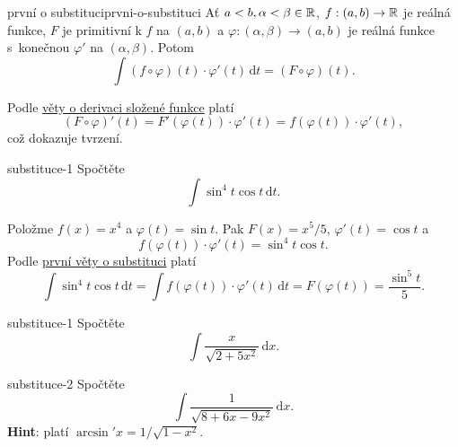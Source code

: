 \begin{theorem}{první o substituci}{prvni-o-substituci}
 Ať $a < b,\alpha < \beta \in \mathbb{R}$, $f:(a,b) \to \mathbb{R}$ je reálná funkce, $F$ je
 primitivní k $f$ na $(a,b)$ a $\varphi:(\alpha,\beta) \to (a,b)$ je reálná
 funkce s~konečnou $\varphi'$ na $(\alpha,\beta)$. Potom
 \[
  \int (f \circ \varphi)(t) \cdot \varphi'(t) \, \mathrm{d}t = (F \circ
  \varphi)(t).
 \]
\end{theorem}
\begin{thmproof}
 Podle \hyperref[thm:derivace-slozene-funkce]{věty o derivaci složené funkce}
 platí
 \[
  (F \circ \varphi)'(t) = F'(\varphi(t)) \cdot \varphi'(t) = f(\varphi(t)) \cdot
  \varphi'(t),
 \]
 což dokazuje tvrzení.
\end{thmproof}
\begin{problem}{}{substituce-1}
 Spočtěte
 \[
  \int \sin^{4}t \cos t \, \mathrm{d}t.
 \]
\end{problem}
\begin{probsol}
 Položme $f(x) = x^{4}$ a $\varphi(t) = \sin t$. Pak $F(x) = x^{5} / 5$,
 $\varphi'(t) = \cos t$ a
 \[
  f(\varphi(t)) \cdot \varphi'(t) = \sin^{4}t \cos t.
 \]
 Podle \hyperref[thm:prvni-o-substituci]{první věty o substituci} platí
 \[
  \int \sin^{4}t \cos t \, \mathrm{d}t = \int f(\varphi(t)) \cdot \varphi'(t) \,
  \mathrm{d}t = F(\varphi(t)) = \frac{\sin^{5} t}{5}.
 \]
\end{probsol}
\begin{exercise}{}{substituce-1}
 Spočtěte
 \[
  \int \frac{x}{\sqrt{2 + 5x^2}} \, \mathrm{d}x.
 \]
\end{exercise}
\begin{exercise}{}{substituce-2}
 Spočtěte
 \[
  \int \frac{1}{\sqrt{8 + 6x - 9x^2}} \, \mathrm{d}x.
 \]
 \textbf{Hint}: platí $\arcsin'x = 1 / \sqrt{1 - x^2}$.
\end{exercise}

